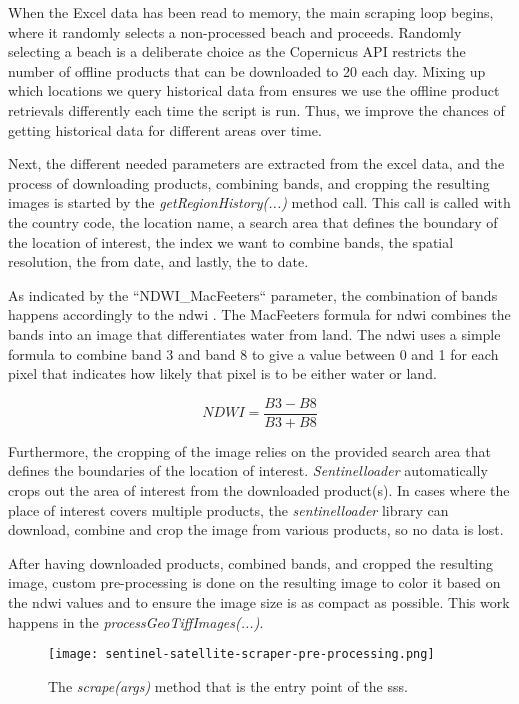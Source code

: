 When the Excel data has been read to memory, the main scraping loop begins, where it randomly selects a non-processed beach and proceeds. Randomly selecting a beach is a deliberate choice as the Copernicus API restricts the number of offline products that can be downloaded to 20 each day. Mixing up which locations we query historical data from ensures we use the offline product retrievals differently each time the script is run. Thus, we improve the chances of getting historical data for different areas over time.

Next, the different needed parameters are extracted from the excel data, and the process of downloading products, combining bands, and cropping the resulting images is started by the \emph{getRegionHistory(...)} method call. This call is called with the country code, the location name, a search area that defines the boundary of the location of interest, the index we want to combine bands, the spatial resolution, the from date, and lastly, the to date.

As indicated by the ``NDWI\_MacFeeters`` parameter, the combination of bands happens accordingly to the \acrfull{ndwi} \cite{ndwi}. The MacFeeters formula for \acrshort{ndwi} combines the bands into an image that differentiates water from land. The \acrshort{ndwi} uses a simple formula to combine band 3 and band 8 to give a value between 0 and 1 for each pixel that indicates how likely that pixel is to be either water or land. \cite{sentinel-2-bands-combinations}

\[ NDWI = \dfrac{B3 - B8}{B3 + B8} \]

Furthermore, the cropping of the image relies on the provided search area that defines the boundaries of the location of interest. \emph{Sentinelloader} automatically crops out the area of interest from the downloaded product(s). In cases where the place of interest covers multiple products, the \emph{sentinelloader} library can download, combine and crop the image from various products, so no data is lost.

After having downloaded products, combined bands, and cropped the resulting image, custom pre-processing is done on the resulting image to color it based on the \acrshort{ndwi} values and to ensure the image size is as compact as possible. This work happens in the \emph{processGeoTiffImages(...)}.

\begin{figure}[h!]
    \centering
    \texttt{[image: sentinel-satellite-scraper-pre-processing.png]}
    \caption{The \emph{scrape(args)} method that is the entry point of the \acrshort{sss}.}
    \label{fig:sentinel-satellite-scraper-pre-processing}
\end{figure}

